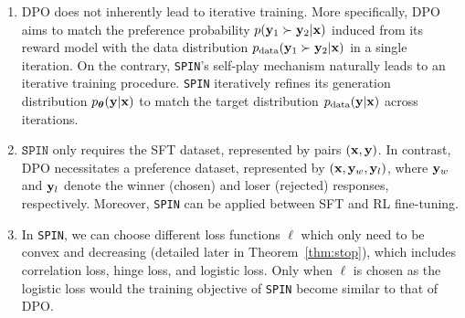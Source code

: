 \documentclass{article}
\newcommand{\method}{\texttt{SPIN}}
\begin{document}
\begin{enumerate}[leftmargin=*,nosep]
\item DPO does not inherently lead to iterative training. More specifically, DPO aims to match the preference probability $p(\mathbf{y}_1 \succ \mathbf{y}_2 | \mathbf{x})$ induced from its reward model with the data distribution $p_{\mathrm{data}}(\mathbf{y}_1 \succ \mathbf{y}_2 |\mathbf{x})$ in a single iteration. On the contrary, \method{}’s self-play mechanism naturally leads to an iterative training procedure.  \method{} iteratively refines its generation distribution $p_{\bm{\theta}}(\mathbf{y}|\mathbf{x})$ to match the target distribution $p_{\text{data}}(\mathbf{y}|\mathbf{x})$ across iterations. 
\item  $\method$ only requires the SFT dataset, represented by pairs $(\mathbf{x}, \mathbf{y})$.
In contrast, DPO necessitates a preference dataset, represented by $(\mathbf{x}, \mathbf{y}_w, \mathbf{y}_l)$, where $\mathbf{y}_w$ and $\mathbf{y}_l$ denote the winner (chosen) and loser (rejected) responses, respectively. Moreover, \method{} can be applied between SFT and RL fine-tuning. 
\item  In \method{}, we can choose different loss functions $\ell$ which only need to be convex and decreasing (detailed later in Theorem~\ref{thm:stop}), which includes correlation loss, hinge loss, and logistic loss. Only when $\ell$ is chosen as the logistic loss would the training objective of \method{} become similar to that of DPO. 
\end{enumerate}
\end{document}
